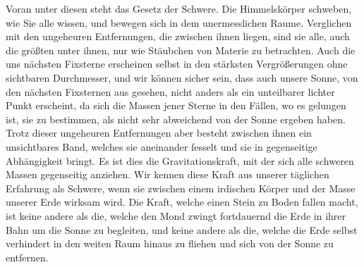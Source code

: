 \documentclass[a4paper, 11pt, oneside, german]{article}
\begin{document}
Voran unter diesen steht das Gesetz der Schwere. Die Himmelskörper schweben, wie Sie alle wissen, und bewegen sich in dem unermesslichen Raume. Verglichen mit den ungeheuren Entfernungen, die zwischen ihnen liegen, sind sie alle, auch die größten unter ihnen, nur wie Stäubchen von Materie zu betrachten. Auch die uns nächsten Fixsterne erscheinen selbst in den stärksten Vergrößerungen ohne sichtbaren Durchmesser, und wir können sicher sein, dass auch unsere Sonne, von den nächsten Fixsternen aus gesehen, nicht anders als ein unteilbarer lichter Punkt erscheint, da sich die Massen jener Sterne in den Fällen, wo es gelungen ist, sie zu bestimmen, als nicht sehr abweichend von der Sonne ergeben haben. Trotz dieser ungeheuren Entfernungen aber besteht zwischen ihnen ein unsichtbares Band, welches sie aneinander fesselt und sie in gegenseitige Abhängigkeit bringt. Es ist dies die Gravitationskraft, mit der sich alle schweren Massen gegenseitig anziehen. Wir kennen diese Kraft aus unserer täglichen Erfahrung als Schwere, wenn sie zwischen einem irdischen Körper und der Masse unserer Erde wirksam wird. Die Kraft, welche einen Stein zu Boden fallen macht, ist keine andere als die, welche den Mond zwingt fortdauernd die Erde in ihrer Bahn um die Sonne zu begleiten, und keine andere als die, welche die Erde selbst verhindert in den weiten Raum hinaus zu fliehen und sich von der Sonne zu entfernen.
\end{document}
